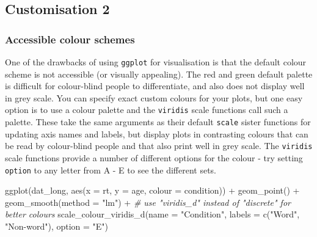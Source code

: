 \documentclass[
  english,
  doc,floatsintext]{apa6}
\newenvironment{Shaded}{\begin{snugshade}}{\end{snugshade}}
\newcommand{\AttributeTok}[1]{\textcolor[rgb]{0.77,0.63,0.00}{#1}}
\newcommand{\CommentTok}[1]{\textcolor[rgb]{0.56,0.35,0.01}{\textit{#1}}}
\newcommand{\FunctionTok}[1]{\textcolor[rgb]{0.00,0.00,0.00}{#1}}
\newcommand{\NormalTok}[1]{#1}
\newcommand{\SpecialCharTok}[1]{\textcolor[rgb]{0.00,0.00,0.00}{#1}}
\newcommand{\StringTok}[1]{\textcolor[rgb]{0.31,0.60,0.02}{#1}}
\begin{document}
\hypertarget{customisation-2}{%
\subsection{Customisation 2}\label{customisation-2}}

\hypertarget{accessible-colour-schemes}{%
\subsubsection{Accessible colour schemes}\label{accessible-colour-schemes}}

One of the drawbacks of using \texttt{ggplot} for visualisation is that the default colour scheme is not accessible (or visually appealing). The red and green default palette is difficult for colour-blind people to differentiate, and also does not display well in grey scale. You can specify exact custom colours for your plots, but one easy option is to use a colour palette and the \texttt{viridis} scale functions call such a palette. These take the same arguments as their default \texttt{scale} sister functions for updating axis names and labels, but display plots in contrasting colours that can be read by colour-blind people and that also print well in grey scale. The \texttt{viridis} scale functions provide a number of different options for the colour - try setting \texttt{option} to any letter from A - E to see the different sets.

\begin{Shaded}
\begin{Highlighting}[]
\FunctionTok{ggplot}\NormalTok{(dat\_long, }\FunctionTok{aes}\NormalTok{(}\AttributeTok{x =}\NormalTok{ rt, }\AttributeTok{y =}\NormalTok{ age, }\AttributeTok{colour =}\NormalTok{ condition)) }\SpecialCharTok{+}
  \FunctionTok{geom\_point}\NormalTok{() }\SpecialCharTok{+}
  \FunctionTok{geom\_smooth}\NormalTok{(}\AttributeTok{method =} \StringTok{"lm"}\NormalTok{) }\SpecialCharTok{+}
  \CommentTok{\# use "viridis\_d" instead of "discrete" for better colours}
  \FunctionTok{scale\_colour\_viridis\_d}\NormalTok{(}\AttributeTok{name =} \StringTok{"Condition"}\NormalTok{,}
                        \AttributeTok{labels =} \FunctionTok{c}\NormalTok{(}\StringTok{"Word"}\NormalTok{, }\StringTok{"Non{-}word"}\NormalTok{),}
                        \AttributeTok{option =} \StringTok{"E"}\NormalTok{)}
\end{Highlighting}
\end{Shaded}
\end{document}
